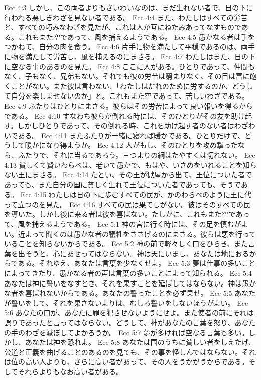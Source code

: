 Ecc 4:3  しかし、この両者よりもさいわいなのは、まだ生れない者で、日の下に行われる悪しきわざを見ない者である。
Ecc 4:4  また、わたしはすべての労苦と、すべての巧みなわざを見たが、これは人が互にねたみあってなすものである。これもまた空であって、風を捕えるようである。
Ecc 4:5  愚かなる者は手をつかねて、自分の肉を食う。
Ecc 4:6  片手に物を満たして平穏であるのは、両手に物を満たして労苦し、風を捕えるのにまさる。
Ecc 4:7  わたしはまた、日の下に空なる事のあるのを見た。
Ecc 4:8  ここに人がある。ひとりであって、仲間もなく、子もなく、兄弟もない。それでも彼の労苦は窮まりなく、その目は富に飽くことがない。また彼は言わない、「わたしはだれのために労するのか、どうして自分を楽しませないのか」と。これもまた空であって、苦しいわざである。
Ecc 4:9  ふたりはひとりにまさる。彼らはその労苦によって良い報いを得るからである。
Ecc 4:10  すなわち彼らが倒れる時には、そのひとりがその友を助け起す。しかしひとりであって、その倒れる時、これを助け起す者のない者はわざわいである。
Ecc 4:11  またふたりが一緒に寝れば暖かである。ひとりだけで、どうして暖かになり得ようか。
Ecc 4:12  人がもし、そのひとりを攻め撃ったなら、ふたりで、それに当るであろう。三つよりの綱はたやすくは切れない。
Ecc 4:13  貧しくて賢いわらべは、老いて愚かで、もはや、いさめをいれることを知らない王にまさる。
Ecc 4:14  たとい、その王が獄屋から出て、王位についた者であっても、また自分の国に貧しく生れて王位についた者であっても、そうである。
Ecc 4:15  わたしは日の下に歩むすべての民が、かのわらべのように王に代って立つのを見た。
Ecc 4:16  すべての民は果てしがない。彼はそのすべての民を導いた。しかし後に来る者は彼を喜ばない。たしかに、これもまた空であって、風を捕えるようである。
Ecc 5:1  神の宮に行く時には、その足を慎むがよい。近よって聞くのは愚かな者の犠牲をささげるのにまさる。彼らは悪を行っていることを知らないからである。
Ecc 5:2  神の前で軽々しく口をひらき、また言葉を出そうと、心にあせってはならない。神は天にいまし、あなたは地におるからである。それゆえ、あなたは言葉を少なくせよ。
Ecc 5:3  夢は仕事の多いことによってきたり、愚かなる者の声は言葉の多いことによって知られる。
Ecc 5:4  あなたは神に誓いをなすとき、それを果すことを延ばしてはならない。神は愚かな者を喜ばれないからである。あなたの誓ったことを必ず果せ。
Ecc 5:5  あなたが誓いをして、それを果さないよりは、むしろ誓いをしないほうがよい。
Ecc 5:6  あなたの口が、あなたに罪を犯させないようにせよ。また使者の前にそれは誤りであったと言ってはならない。どうして、神があなたの言葉を怒り、あなたの手のわざを滅ぼしてよかろうか。
Ecc 5:7  夢が多ければ空なる言葉も多い。しかし、あなたは神を恐れよ。
Ecc 5:8  あなたは国のうちに貧しい者をしえたげ、公道と正義を曲げることのあるのを見ても、その事を怪しんではならない。それは位の高い人よりも、さらに高い者があって、その人をうかがうからである。そしてそれらよりもなお高い者がある。
